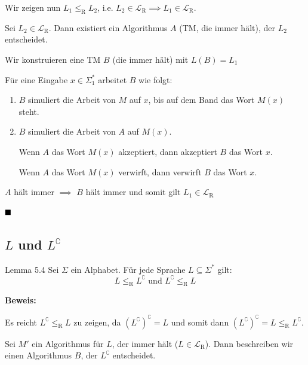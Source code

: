 \documentclass[a4paper, 11pt]{article}
\def\L{\mathcal{L}}
\def\Lr{\mathcal{L}_\text{R}}
\begin{document}
                Wir zeigen nun $L_1 \leq_{\text{R}} L_2$, i.e. $L_2 \in \Lr \implies L_1 \in \Lr$.
            
                Sei $L_2 \in \Lr$. Dann existiert ein Algorithmus $A$ (TM, die immer hält), der $L_2$ entscheidet.

                Wir konstruieren eine TM $B$ (die immer hält) mit $L(B) = L_1$
            
                Für eine Eingabe $x \in \Sigma_1^*$ arbeitet $B$ wie folgt:
                \begin{enumerate}[label=(\roman*)]
                    \item $B$ simuliert die Arbeit von $M$ auf $x$, bis auf dem Band das Wort $M(x)$ steht.
                    \item $B$ simuliert die Arbeit von $A$ auf $M(x)$.
                    
                    Wenn $A$ das Wort $M(x)$ akzeptiert, dann akzeptiert $B$ das Wort $x$.
            
                    Wenn $A$ das Wort $M(x)$ verwirft, dann verwirft $B$ das Wort $x$.
                \end{enumerate}
                $A$ hält immer $\implies$ $B$ hält immer und somit gilt $L_1 \in \Lr$  
            
                $\hfill\blacksquare$
            
            
            
                \subsection{$L$ und $L^\complement$}

                \begin{mainbox}{Lemma 5.4}
                    Sei $\Sigma$ ein Alphabet. Für jede Sprache $L \subseteq \Sigma^*$ gilt:
                 $$L \leq_\text{R} L^\complement \text{ und } L^\complement \leq_\text{R} L$$
                \end{mainbox}
                \textbf{Beweis: }
            
                Es reicht $L^\complement \leq_\text{R} L$ zu zeigen, da $(L^\complement)^\complement = L$ und somit dann $(L^\complement)^\complement = L \leq_\text{R} L^\complement$.
            
                Sei $M'$ ein Algorithmus für $L$, der immer hält ($L \in \L_\text{R}$). Dann beschreiben wir einen Algorithmus $B$, der $L^\complement$ entscheidet. 
                
\end{document}
